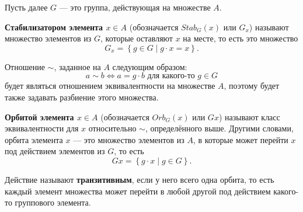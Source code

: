 Пусть далее $G$ --- это группа, действующая на множестве $A$.
\begin{definition}\label{def:stab}
     \textbf{Стабилизатором элемента $x \in A$} (обозначается $Stab_G(x)$ или $G_x$) называют множество элементов из $G$, которые оставляют $x$ на месте, то есть это множество 
     \[
     G_x = \left\{ g \in G \mid g \cdot x = x \right\}.
     \]
\end{definition}

Отношение $\sim$, заданное на $A$ следующим образом:
\[
	a \sim b \iff a = g \cdot b \text{ для какого-то } g \in G
\]
будет являться отношением эквивалентности на множестве $A$, поэтому будет также задавать разбиение этого множества.
\begin{definition}\label{def:orb}
      \textbf{Орбитой элемента $x \in A$} (обозначается $Orb_G(x)$ или $Gx$) называют класс эквивалентности для $x$ относительно $\sim$, определённого выше. Другими словами, орбита элемента $x$ --- это множество элементов из $A$, в которые может перейти $x$ под действием элементов из $G$, то есть 
      \[
      	Gx = \left\{ g \cdot x \mid g \in G \right\}.
      \]
\end{definition}

\begin{definition}\label{def:tr_action}
     Действие называют \textbf{транзитивным}, если у него всего одна орбита, то есть каждый элемент множества может перейти в любой другой под действием какого-то группового элемента.
\end{definition}
